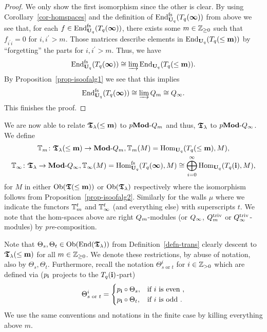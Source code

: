 \begin{proof}
We only show the first isomorphism since the other is clear.
By using Corollary~\ref{cor-homspaces} and the definition 
of $\End^{\mathrm{fs}}_{\Uq}(\Tn{\bbin})$ from above we 
see that, for each $f\in\End^{\mathrm{fs}}_{\Uq}(\Tn{\bbin})$, 
there exists some $m\in\bN$ such that $f_{i^{\prime}i}=0$ for $i,i^{\prime}>m$.
Those matrices describe elements in $\End_{\Uq}(\Tn{\leq\bbm})$ by ``forgetting'' the parts for $i,i^{\prime}>m$. Thus, we have
\[
\End^{\mathrm{fs}}_{\Uq}(\Tn{\bbin})\cong \varinjlim \End_{\Uq}(\Tn{\leq\bbm}).
\]
By Proposition~\ref{prop-isoofalg1} we see that this implies
\[
\End^{\mathrm{fs}}_{\Uq}(\Tn{\bbin})\cong \varinjlim \Am\cong\Ai.
\]
This finishes the proof.
\end{proof}



We are now able to relate 
$\T_{\lambda}(\leq \bbm)$ to 
$\pModAm$ and thus, $\T_{\lambda}$ to $\pModAi$. 
We define
\begin{gather*}
\bV\colon\T_{\lambda}(\leq \bbm)\to\ModAm, \bV(M)=\Hom_{\Uq}(\Tn{\leq\bbm},M),
\\
\bVi\colon\T_{\lambda}\to\ModAi, \bVi(M)=\Hom^{\mathrm{fs}}_{\Uq}(\Tn{\bbin},M)\cong \bigoplus_{i=0}^{\infty}\Hom_{\Uq}(\Tn{\bbi},M),
\end{gather*}
for $M$ in either $\Ob(\T(\leq \bbm))$ or $\Ob(\T_{\lambda})$ 
respectively where the isomorphism follows from 
Proposition~\ref{prop-isoofalg2}. Similarly for 
the walls $\mu$ where we indicate the functors 
$\bV^t$ and $\bVi^t$ (and everything else) with 
superscripts $t$. We note that the hom-spaces above 
are right $\Am$-modules (or $\Ai$, $\At$ or $\Ait$-modules) by \textit{pre}-composition.



Note that $\Theta_s,\Theta_t\in\Ob(\End(\T_{\lambda}))$ 
from Definition~\ref{defn-trans} clearly descent 
to $\T_{\lambda}(\leq\bbm)$ for all $m\in\bN$. 
We denote these restrictions, by abuse of notation, 
also by $\Theta_s,\Theta_t$. Furthermore, 
recall the notation $\Theta_{s\text{ or }t}^i$ for $i\in\bZ_{>0}$ 
which are defined via ($p_{\bbi}$ projects to the $\Tn{\bbi}$-part)
\[
\Theta_{s\text{ or }t}^i=\begin{cases}p_{\bbi}\circ\Theta_{s}, &\text{if }i\text{ is even },\\
p_{\bbi}\circ\Theta_{t}, &\text{if }i\text{ is odd }.
\end{cases}
\]
We use the 
same conventions and notations in the finite case by killing everything above $m$.



